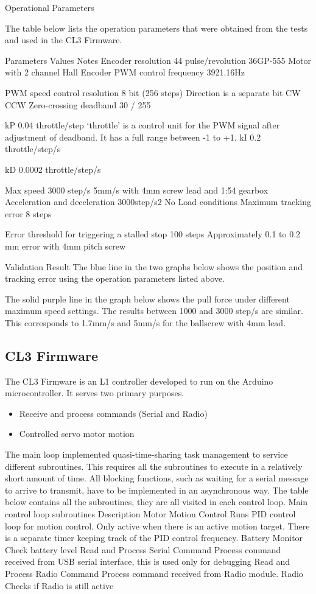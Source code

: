 \begin{itemize}
Operational Parameters

The table below lists the operation parameters that were obtained from the tests and used in the CL3 Firmware.

Parameters
Values
Notes
Encoder resolution
44 pulse/revolution
36GP-555 Motor with 2 channel Hall Encoder
PWM control frequency
3921.16Hz


PWM speed control resolution
8 bit (256 steps)
Direction is a separate bit
CW CCW Zero-crossing deadband
30 / 255 


kP
0.04 throttle/step
‘throttle’ is a control unit for the PWM signal after adjustment of deadband. It has a full range between -1 to +1. 
kI
0.2 throttle/step/s


kD
0.0002 throttle/step/s


Max speed
3000 step/s 
5mm/s with 4mm screw lead and 1:54 gearbox
Acceleration and deceleration
3000step/s2
No Load conditions
Maximum tracking error
8 steps


Error threshold for triggering a stalled stop
100 steps
Approximately 0.1 to 0.2 mm error with 4mm pitch screw


Validation Result
The blue line in the two graphs below shows the position and tracking error using the operation parameters listed above.

The solid purple line in the graph below shows the pull force under different maximum speed settings. The results between 1000 and 3000 step/s are similar. This corresponds to 1.7mm/s and 5mm/s for the ballscrew with 4mm lead.

\subsection{CL3 Firmware}
The CL3 Firmware is an L1 controller developed to run on the Arduino microcontroller. It serves two primary purposes.

\begin{itemize}
\item Receive and process commands (Serial and Radio)
\item Controlled servo motor motion
\end{itemize}

The main loop implemented quasi-time-sharing task management to service different subroutines. This requires all the subroutines to execute in a relatively short amount of time. All blocking functions, such as waiting for a serial message to arrive to transmit, have to be implemented in an asynchronous way. The table below contains all the subroutines, they are all visited in each control loop.
Main control loop subroutines
Description
Motor Motion Control
Runs PID control loop for motion control. Only active when there is an active motion target. There is a separate timer keeping track of the PID control frequency.
Battery Monitor
Check battery level
Read and Process Serial Command 
Process command received from USB serial interface, this is used only for debugging
Read and Process Radio Command 
Process command received from Radio module. 
Radio
Checks if Radio is still active



\end{itemize}
